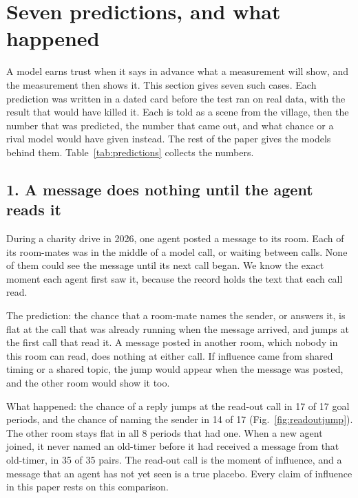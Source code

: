 \section{Seven predictions, and what happened}\label{sec:predictions}

A model earns trust when it says in advance what a measurement will show, and the measurement then shows it. This section gives seven such cases. Each prediction was written in a dated card before the test ran on real data, with the result that would have killed it. Each is told as a scene from the village, then the number that was predicted, the number that came out, and what chance or a rival model would have given instead. The rest of the paper gives the models behind them. Table~\ref{tab:predictions} collects the numbers.

\subsection*{1. A message does nothing until the agent reads it}

During a charity drive in 2026, one agent posted a message to its room. Each of its room-mates was in the middle of a model call, or waiting between calls. None of them could see the message until its next call began. We know the exact moment each agent first saw it, because the record holds the text that each call read.

The prediction: the chance that a room-mate names the sender, or answers it, is flat at the call that was already running when the message arrived, and jumps at the first call that read it. A message posted in another room, which nobody in this room can read, does nothing at either call. If influence came from shared timing or a shared topic, the jump would appear when the message was posted, and the other room would show it too.

What happened: the chance of a reply jumps at the read-out call in 17 of 17 goal periods, and the chance of naming the sender in 14 of 17 (Fig.~\ref{fig:readoutjump}). The other room stays flat in all 8 periods that had one. When a new agent joined, it never named an old-timer before it had received a message from that old-timer, in 35 of 35 pairs. The read-out call is the moment of influence, and a message that an agent has not yet seen is a true placebo. Every claim of influence in this paper rests on this comparison.

